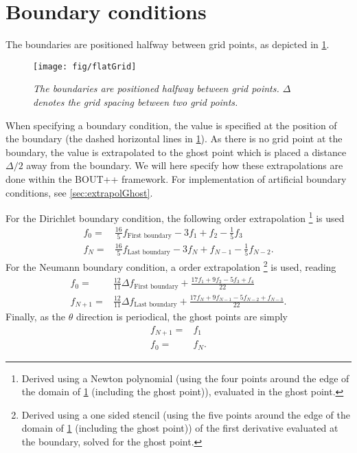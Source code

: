 \section{Boundary conditions}
%
The boundaries are positioned halfway between grid points, as depicted in \cref{fig:flatBC}.
%
\begin{figure}[htb]
    \centering
    \texttt{[image: fig/flatGrid]}
    \caption{\textit{
            The boundaries are positioned halfway between grid points.
            $\Delta$ denotes the grid spacing between two grid points.
        }}
    \label{fig:flatBC}
\end{figure}
%

\noindent
When specifying a boundary condition, the value is specified at the position of the boundary (the dashed horizontal lines in \cref{fig:flatBC}).
As there is no grid point at the boundary, the value is extrapolated to the ghost point which is placed a distance $\Delta/2$ away from the boundary.
We will here specify how these extrapolations are done within the BOUT++ framework.
For implementation of artificial boundary conditions, see \cref{sec:extrapolGhost}.

For the Dirichlet boundary condition, the following  order extrapolation%
%
\footnote{
    Derived using a Newton polynomial (using the four points around the edge of the domain of \cref{fig:flatBC} (including the ghost point)), evaluated in the ghost point.
} %
is used
%
\begin{align*}
      f_{0} =& \frac{16}{5}f_{\text{First boundary}}
              - 3          f_1
              +            f_2
              - \frac{1}{5}f_3
    \\
      f_{N} =& \frac{16}{5}f_{\text{Last boundary}}
              - 3          f_{N}
              +            f_{N-1}
              - \frac{1}{5}f_{N-2}.
\end{align*}
%
For the Neumann boundary condition, a  order extrapolation%
%
\footnote{
    Derived using a one sided stencil (using the five points around the edge of the domain of \cref{fig:flatBC} (including the ghost point)) of the first derivative evaluated at the boundary, solved for the ghost point.
} %
%
is used, reading
%
\begin{align*}
      f_0 =& \frac{12}{11}\Delta f_{\text{First boundary}}
                +
                \frac{
                  17f_1
                +  9f_2
                -  5f_3
                +   f_4
               }{22}
    \\
      f_{N+1} =& \frac{12}{11}\Delta f_{\text{Last boundary}}
                +
                \frac{
                  17f_{N}
                +  9f_{N-1}
                -  5f_{N-2}
                +   f_{N-3}
               }{22}.
\end{align*}
%
Finally, as the $\theta$ direction is periodical, the ghost points are simply
%
\begin{align*}
    f_{N+1} =& f_{1}
    \\
    f_{0} =& f_{N}.
\end{align*}
